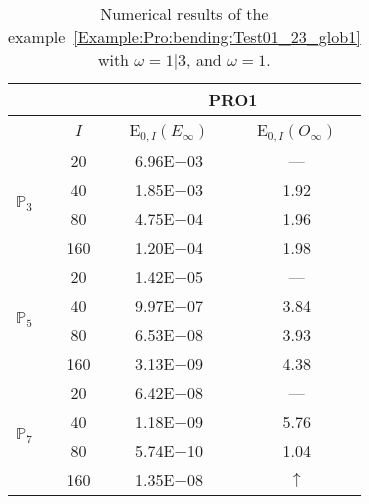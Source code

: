\begin{table}[H]
\caption{Numerical results of the example~\ref{Example:Pro:bending:Test01_23_glob1} with $\omega=1|3$, and $\omega=1$.}
\setlength{\tabcolsep}{5pt}
\centering
\begin{tabular}{@{}l c c c@{}}
\toprule
 &  & \multicolumn{2}{c}{PRO1}\\
\midrule
 & $I$ & E$_{0,I}(E_{\infty})$ & E$_{0,I}(O_{\infty})$\\
\midrule
\multirow{4}{*}{$\mathbb{P}_{3}$} & 20 & 6.96E$-$03 & ---\\
 & 40 & 1.85E$-$03 & 1.92\\
 & 80 & 4.75E$-$04 & 1.96\\
 & 160 & 1.20E$-$04 & 1.98\\
\midrule
\multirow{4}{*}{$\mathbb{P}_{5}$} & 20 & 1.42E$-$05 & ---\\
 & 40 & 9.97E$-$07 & 3.84\\
 & 80 & 6.53E$-$08 & 3.93\\
 & 160 & 3.13E$-$09 & 4.38\\
\midrule
\multirow{4}{*}{$\mathbb{P}_{7}$} & 20 & 6.42E$-$08 & ---\\
 & 40 & 1.18E$-$09 & 5.76\\
 & 80 & 5.74E$-$10 & 1.04\\
 & 160 & 1.35E$-$08 & $\uparrow$\\
\bottomrule
\end{tabular}
\label{Table:PRO:test_01_23_test14}
\end{table}
